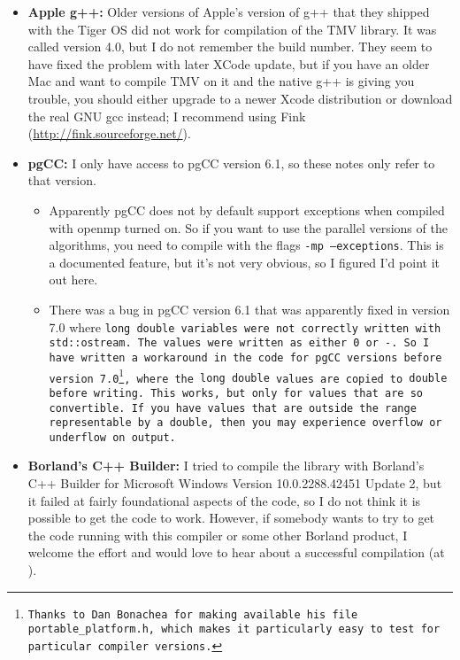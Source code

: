 \begin{itemize}
\item {\bf Apple g++:}
Older versions of Apple's version of g++ that they shipped with the Tiger OS did not work for 
compilation of the TMV library.  It was called version 4.0, but I do not remember the build number.
They seem to have fixed the problem with later XCode update,
but if you have an older Mac and want to compile TMV on it and the native g++ 
is giving you trouble,
you should either upgrade to a newer Xcode distribution or download the real GNU gcc instead;  
I recommend using Fink (\url{http://fink.sourceforge.net/}).

\item {\bf pgCC:}
I only have access to pgCC version 6.1, so these notes only refer to that version.
\begin{itemize}
\item
Apparently pgCC does not by default support exceptions when compiled 
with openmp turned on.  
So if you want to use the parallel versions of the algorithms,
you need to compile with the flags \texttt{-mp --exceptions}.  This is a documented feature,
but it's not very obvious, so I figured I'd point it out here.

\item 
There was a bug in pgCC version 6.1 that was apparently fixed in version 7.0 where
\tt{long double} variables were not correctly written with \tt{std::ostream}.  The values
were written as either \tt{0} or \tt{-}.  So I have written a workaround in the code for
pgCC versions before version 7.0\footnote{
Thanks to Dan Bonachea for making available his file \texttt{portable\_platform.h},
which makes it particularly easy to test for particular compiler versions.},
where the \tt{long double} values are copied to 
\tt{double} before writing.  This works, but only for values that are so convertible.
If you have values that are outside the range representable by a \tt{double}, then 
you may experience overflow or underflow on output.

\end{itemize}

\item {\bf Borland's C++ Builder:}
I tried to compile the library with Borland's C++ Builder for Microsoft Windows
Version 10.0.2288.42451 Update 2, but it failed at fairly foundational aspects of the 
code, so I do not think it is possible to get the code to work.  However, if somebody wants
to try to get the code running with this compiler or some other Borland product, 
I welcome the effort and would
love to hear about a successful compilation (at \mygroup).


\end{itemize}
